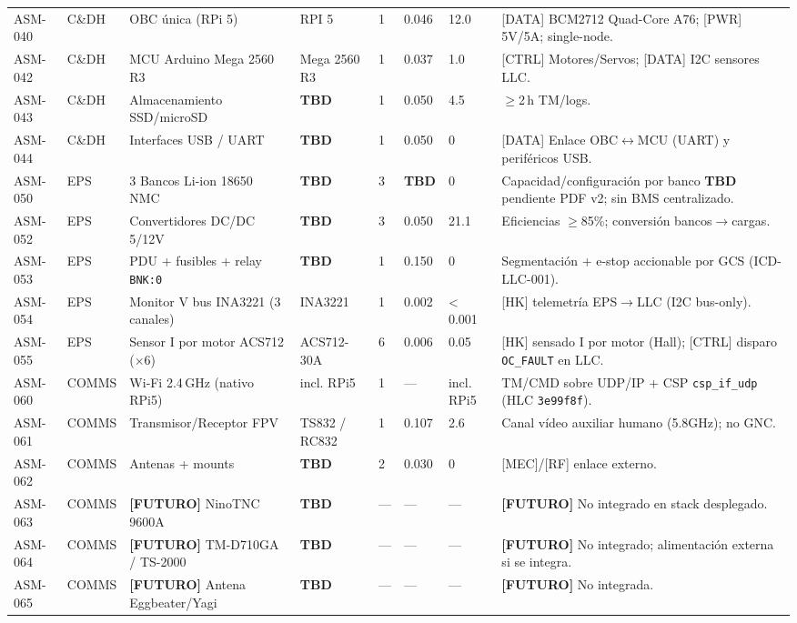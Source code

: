 \begin{table}[H]
{\begin{tabular}{p{1.4cm} p{1.5cm} p{4.5cm} p{3.5cm} p{0.9cm} p{1.5cm} p{1.5cm} p{4.5cm}}
ASM-040 & C\&DH & OBC única (RPi 5) & RPI 5 & 1 & 0.046 & 12.0 & [DATA] BCM2712 Quad-Core A76; [PWR] 5V/5A; single-node. \\
ASM-042 & C\&DH & MCU Arduino Mega 2560 R3 & Mega 2560 R3 & 1 & 0.037 & 1.0 & [CTRL] Motores/Servos; [DATA] I2C sensores LLC. \\
ASM-043 & C\&DH & Almacenamiento SSD/microSD & \textbf{TBD} & 1 & 0.050 & 4.5 & $\ge$2\,h TM/logs. \\
ASM-044 & C\&DH & Interfaces USB / UART & \textbf{TBD} & 1 & 0.050 & 0 & [DATA] Enlace OBC$\leftrightarrow$MCU (UART) y periféricos USB. \\

ASM-050 & EPS & 3 Bancos Li-ion 18650 NMC & \textbf{TBD} & 3 & \textbf{TBD} & 0 & Capacidad/configuración por banco \textbf{TBD} pendiente PDF v2; sin BMS centralizado. \\
ASM-052 & EPS & Convertidores DC/DC 5/12V & \textbf{TBD} & 3 & 0.050 & 21.1 & Eficiencias $\ge$85\%; conversión bancos$\rightarrow$cargas. \\
ASM-053 & EPS & PDU + fusibles + relay \texttt{BNK:0} & \textbf{TBD} & 1 & 0.150 & 0 & Segmentación + e-stop accionable por GCS (ICD-LLC-001). \\
ASM-054 & EPS & Monitor V bus INA3221 (3 canales) & INA3221 & 1 & 0.002 & < 0.001 & [HK] telemetría EPS$\rightarrow$LLC (I2C bus-only). \\
ASM-055 & EPS & Sensor I por motor ACS712 (×6) & ACS712-30A & 6 & 0.006 & 0.05 & [HK] sensado I por motor (Hall); [CTRL] disparo \texttt{OC\_FAULT} en LLC. \\

ASM-060 & COMMS & Wi‑Fi 2.4\,GHz (nativo RPi5) & incl. RPi5 & 1 & --- & incl. RPi5 & TM/CMD sobre UDP/IP + CSP \texttt{csp\_if\_udp} (HLC \texttt{3e99f8f}). \\
ASM-061 & COMMS & Transmisor/Receptor FPV & TS832 / RC832 & 1 & 0.107 & 2.6 & Canal vídeo auxiliar humano (5.8GHz); no GNC. \\
ASM-062 & COMMS & Antenas + mounts & \textbf{TBD} & 2 & 0.030 & 0 & [MEC]/[RF] enlace externo. \\

ASM-063 & COMMS & \textbf{[FUTURO]} NinoTNC 9600A & \textbf{TBD} & --- & --- & --- & \textbf{[FUTURO]} No integrado en stack desplegado. \\
ASM-064 & COMMS & \textbf{[FUTURO]} TM-D710GA / TS-2000 & \textbf{TBD} & --- & --- & --- & \textbf{[FUTURO]} No integrado; alimentación externa si se integra. \\
ASM-065 & COMMS & \textbf{[FUTURO]} Antena Eggbeater/Yagi & \textbf{TBD} & --- & --- & --- & \textbf{[FUTURO]} No integrada. \\


\end{tabular}}
\end{table}
